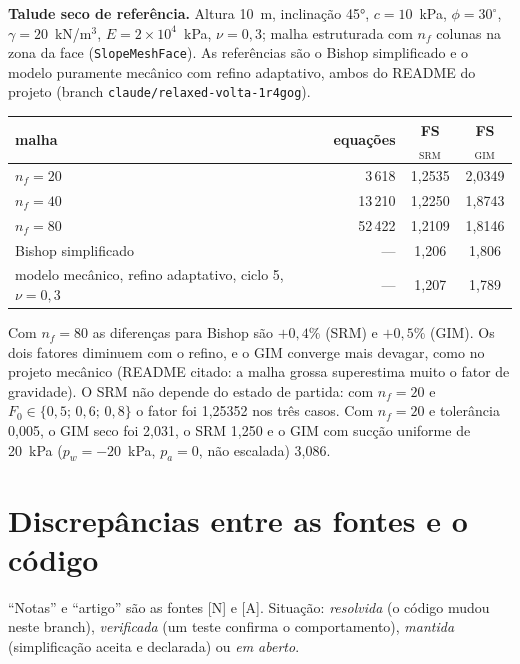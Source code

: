 \documentclass[11pt,a4paper]{article}
\numberwithin{equation}{section}
\newcommand{\code}[1]{\texttt{#1}}
\begin{document}
\textbf{Talude seco de referência.} Altura 10~m, inclinação 45°, $c=10$~kPa, $\phi=30^\circ$, $\gamma=20$~kN/m$^3$,
$E=2\times10^4$~kPa, $\nu=0{,}3$; malha estruturada com $n_f$ colunas na zona da face (\code{SlopeMeshFace}). As
referências são o Bishop simplificado e o modelo puramente mecânico com refino adaptativo, ambos do README do projeto
 (branch \code{claude/relaxed-volta-1r4gog}).
\begin{center}\small
\begin{tabular}{@{}lrcc@{}}
\toprule
malha & equações & FS$_{\mathrm{SRM}}$ & FS$_{\mathrm{GIM}}$\\
\midrule
$n_f=20$ & 3\,618 & 1,2535 & 2,0349\\
$n_f=40$ & 13\,210 & 1,2250 & 1,8743\\
$n_f=80$ & 52\,422 & 1,2109 & 1,8146\\
\midrule
Bishop simplificado & --- & 1,206 & 1,806\\
modelo mecânico, refino adaptativo, ciclo 5, $\nu=0{,}3$ & --- & 1,207 & 1,789\\
\bottomrule
\end{tabular}
\end{center}
Com $n_f=80$ as diferenças para Bishop são $+0{,}4\%$ (SRM) e $+0{,}5\%$ (GIM). Os dois fatores diminuem com o refino,
e o GIM converge mais devagar, como no projeto mecânico (README citado: a malha grossa superestima muito o fator de
gravidade). O SRM não depende do estado de partida: com $n_f=20$ e $F_0\in\{0{,}5;\,0{,}6;\,0{,}8\}$ o fator foi
1,25352 nos três casos. Com $n_f=20$ e tolerância 0,005, o GIM seco foi 2,031, o SRM 1,250 e o GIM com sucção uniforme
de 20~kPa ($p_w=-20$~kPa, $p_a=0$, não escalada) 3,086.

\section{Discrepâncias entre as fontes e o código}\label{sec:disc}

``Notas'' e ``artigo'' são as fontes [N] e [A]. Situação: \emph{resolvida} (o código mudou neste branch),
\emph{verificada} (um teste confirma o comportamento), \emph{mantida} (simplificação aceita e declarada) ou \emph{em
aberto}.
\end{document}
